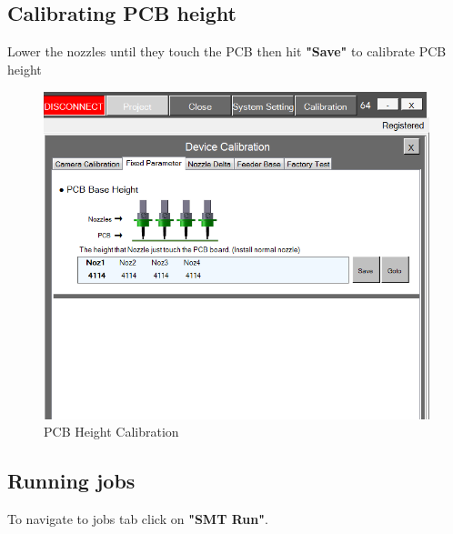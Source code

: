 \documentclass[a4paper,10pt]{report}
\begin{document}
\subsection{Calibrating PCB height}
Lower the nozzles until they touch the PCB then hit \textbf{"Save"} to calibrate PCB height
 \begin{figure}[!htb]
 \centering
 \includegraphics[width=1\textwidth]{images/scrot41.png}
 \caption{PCB Height Calibration}
\end{figure}
\newpage
\subsection{Running jobs}
To navigate to jobs tab click on \textbf{"SMT Run"}.\\
\end{document}
